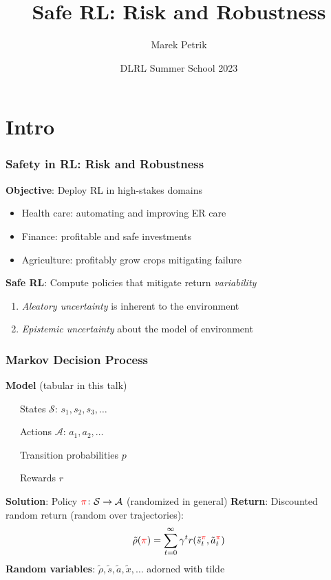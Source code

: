 \documentclass{beamer}
\title{Safe RL: Risk and Robustness}
\author{Marek Petrik}
\institute{Department of Computer Science\\University of New Hampshire}
\date{DLRL Summer School 2023}
\newcommand{\tc}[2]{\textcolor{#1}{#2}}
\newcommand{\tcr}[1]{\tc{red}{#1}}
\begin{document}
\begin{frame}
\maketitle
\end{frame}

\section*{Intro}

\begin{frame} \frametitle{Safety in RL: Risk and Robustness}
  \textbf{Objective}: Deploy RL in high-stakes domains
  \begin{itemize}
  \item Health care: automating and improving ER care
  \item Finance: profitable and safe investments 
  \item Agriculture: profitably grow crops mitigating failure
  \end{itemize}
  \vfill
  \textbf{Safe RL}: Compute policies that mitigate return \emph{variability}
  \begin{enumerate}
  \item \emph{Aleatory uncertainty} is inherent to the environment
  \item \emph{Epistemic uncertainty} about the model of environment 
  \end{enumerate}
\end{frame}

\begin{frame} \frametitle{Markov Decision Process}
  \textbf{Model} (tabular in this talk) \par
    {\small
   ~~~States $\mathcal{S}$: $s_1, s_2, s_3, \dots $ \par
   ~~~Actions $\mathcal{A}$: $a_1, a_2, \dots $ \par
   ~~~Transition probabilities $p$ \par
   ~~~Rewards $r$}
    \vfill 
    \textbf{Solution}: Policy $\tcr{\pi}\colon \mathcal{S} \to \mathcal{A}$  (randomized in general) 
    \vfill
    \textbf{Return}: Discounted random return (random over trajectories):
    \[
      \tilde{\rho}(\tcr{\pi}) = \sum_{t=0}^\infty \gamma^t r(\tilde{s}^{\tcr{\pi}}_t, \tilde{a}^{\tcr{\pi}}_t)
    \]
    \vfill
    \textbf{Random variables}: $\tilde{\rho}, \tilde{s}, \tilde{a}, \tilde{x}, \dots $ adorned with tilde
\end{frame}
\end{document}
